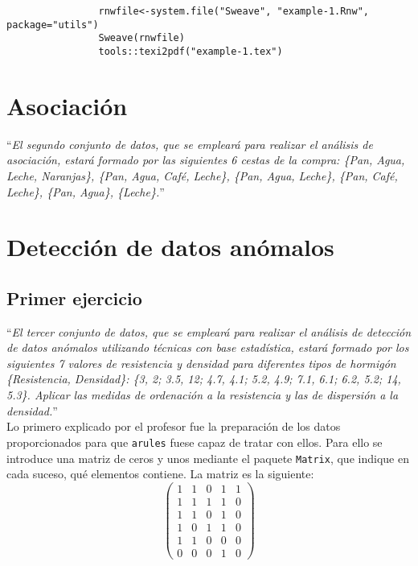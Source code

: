 \documentclass[12pt]{report}\usepackage[]{graphicx}\usepackage[dvipsnames]{xcolor}
\begin{document}
			\begin{verbatim}
				rnwfile<-system.file("Sweave", "example-1.Rnw", package="utils")
				Sweave(rnwfile)
				tools::texi2pdf("example-1.tex")
			\end{verbatim}
		
		\section{Asociación}
		
			``\textit{El segundo conjunto de datos, que se empleará para realizar el análisis de asociación, estará formado por las siguientes 6 cestas de la compra: \{Pan, Agua, Leche, Naranjas\}, \{Pan, Agua, Café, Leche\}, \{Pan, Agua, Leche\}, \{Pan, Café, Leche\}, \{Pan, Agua\}, \{Leche\}.}''
		
		\section{Detección de datos anómalos}
		
			\subsection{Primer ejercicio}
			
				``\textit{El tercer conjunto de datos, que se empleará para realizar el análisis de detección de datos anómalos utilizando técnicas con base estadística, estará formado por los siguientes 7 valores de resistencia y densidad para diferentes tipos de hormigón \{Resistencia, Densidad\}: \{3, 2; 3.5, 12; 4.7, 4.1; 5.2, 4.9; 7.1, 6.1; 6.2, 5.2; 14, 5.3\}. Aplicar las medidas de ordenación a la resistencia y las de dispersión a la densidad.}''\\
				
				Lo primero explicado por el profesor fue la preparación de los datos proporcionados para que \texttt{arules} fuese capaz de tratar con ellos. Para ello se introduce una matriz de ceros y unos mediante el paquete \texttt{Matrix}, que indique en cada suceso, qué elementos contiene. La matriz es la siguiente: 
				$$
				\begin{pmatrix}
					1 & 1 & 0 & 1 & 1\\
					1 & 1 & 1 & 1 & 0\\
					1 & 1 & 0 & 1 & 0\\
					1 & 0 & 1 & 1 & 0\\
					1 & 1 & 0 & 0 & 0\\
					0 & 0 & 0 & 1 & 0
				\end{pmatrix}
				$$
				
\end{document}
